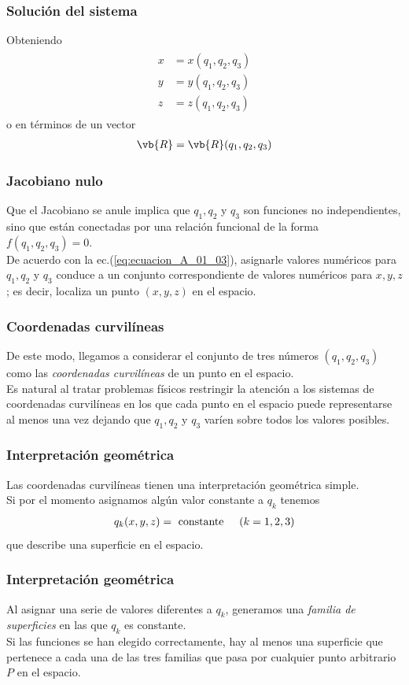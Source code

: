 \begin{frame}
\frametitle{Solución del sistema}
Obteniendo
\begin{align}
\begin{aligned}
x &= x (q_{1}, q_{2}, q_ {3}) \\
y &= y (q_{1}, q_{2}, q_ {3}) \\
z &= z (q_{1}, q_{2}, q_ {3})
\end{aligned}
\label{eq:ecuacion_A_01_03}    
\end{align}
o en términos de un vector
\begin{align*}
\vb{R} = \vb{R} (q_{1}, q_{2}, q_{3})
\end{align*}
\end{frame}
\begin{frame}
\frametitle{Jacobiano nulo}
Que el Jacobiano se anule implica que $q_{1}, q_{2}$ y $q_{3}$ son funciones no independientes, sino que están conectadas por una relación funcional de la forma $f (q_{1}, q_{2}, q_{3}) = 0$.
\\
\bigskip
De acuerdo con la ec.(\ref{eq:ecuacion_A_01_03}), asignarle valores numéricos para $q_{1}, q_{2}$ y $q_{3}$ conduce a un conjunto correspondiente de valores numéricos para $x, y, z$; es decir, localiza un punto $(x, y, z)$ en el espacio.
\end{frame}
\begin{frame}
\frametitle{Coordenadas curvilíneas}
De este modo, llegamos a considerar el conjunto de tres números $(q_{1}, q_{2}, q_{3})$ como las \emph{coordenadas curvilíneas} de un punto en el espacio.
\\
\bigskip
Es natural al tratar problemas físicos restringir la atención a los sistemas de coordenadas curvilíneas en los que cada punto en el espacio puede representarse al menos una vez dejando que $q_{1}, q_{2}$ y $q_{3}$ varíen sobre todos los valores posibles.
\end{frame}
\begin{frame}
\frametitle{Interpretación geométrica}
Las coordenadas curvilíneas tienen una interpretación geométrica simple.
\\
\bigskip
\pause
Si por el momento asignamos algún valor constante a $q_{k}$ tenemos
\begin{align*}
q_{k} (x, y, z) = \mbox{ constante} \hspace{0.5cm} (k = 1, 2, 3)
\end{align*}
que describe una superficie en el espacio.
\end{frame}
\begin{frame}
\frametitle{Interpretación geométrica}
Al asignar una serie de valores diferentes a $q_{k}$, generamos una \emph{familia de superficies} en las que $q_{k}$ es constante.
 \\
 \bigskip
Si las funciones se han elegido correctamente, hay al menos una superficie que pertenece a cada una de las tres familias que pasa por cualquier punto arbitrario $P$ en el espacio.
\end{frame}
